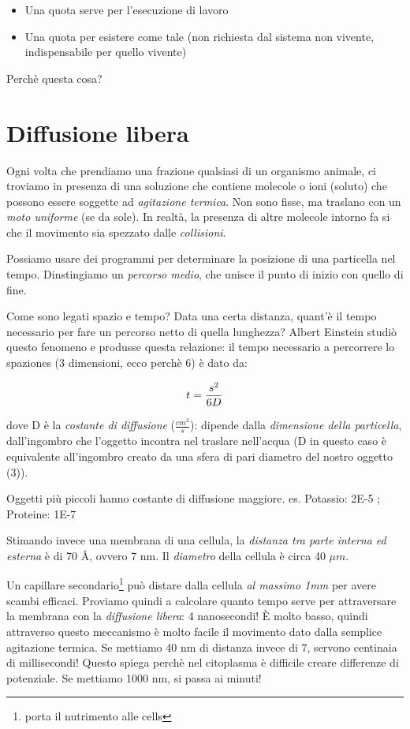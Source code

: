 \documentclass[a4paper,12pt]{article}
\begin{document}
\begin{itemize}
\item{Una quota serve per l'esecuzione di lavoro}
\item{Una quota per esistere come tale (non richiesta dal sistema non vivente, indispensabile per quello vivente)}
\end{itemize}

Perchè questa cosa?

\section{Diffusione libera}
Ogni volta che prendiamo una frazione qualsiasi di un organismo animale, ci troviamo in presenza di una soluzione che contiene molecole o ioni (soluto) che possono essere soggette ad \emph{agitazione termica}. Non sono fisse, ma traslano con un \emph{moto uniforme} (se da sole). In realtà, la presenza di altre molecole intorno fa si che il movimento sia spezzato dalle \emph{collisioni}.

Possiamo usare dei programmi per determinare la posizione di una particella nel tempo. 
Dinstingiamo un \emph{percorso medio}, che unisce il punto di inizio con quello di fine. 

Come sono legati spazio e tempo? Data una certa distanza, quant'è il tempo necessario per fare un percorso netto di quella lunghezza? 
Albert Einstein studiò questo fenomeno e produsse questa relazione: il tempo necessario a percorrere lo spaziones (3 dimensioni, ecco perchè 6) è dato da:

\begin{equation}
\centering
t=\frac{s^{2}}{6D}
\end{equation}

dove D è la \emph{costante di diffusione} ($\frac{cm^{2}}{s}$): dipende dalla \emph{dimensione della particella}, dall'ingombro che l'oggetto incontra nel traslare nell'acqua (D in questo caso è equivalente all'ingombro creato da una sfera di pari diametro del nostro oggetto (3)).

Oggetti più piccoli hanno costante di diffusione maggiore. 
es. Potassio: 2E-5 ; Proteine: 1E-7

Stimando invece una membrana di una cellula, la \emph{distanza tra parte interna ed esterna} è di 70 \AA, ovvero 7 nm.
Il \emph{diametro} della cellula è circa 40 $\mu m $.

Un capillare secondario\footnote{porta il nutrimento alle cells} può distare dalla cellula \emph{al massimo 1mm} per avere scambi efficaci. Proviamo quindi a calcolare quanto tempo serve per attraversare la membrana con la \emph{diffusione libera}: 4 nanosecondi! È molto basso, quindi attraverso questo meccanismo è molto facile il movimento dato dalla semplice agitazione termica. Se mettiamo 40 nm di distanza invece di 7, servono centinaia di millisecondi! Questo spiega perchè nel citoplasma è difficile creare differenze di potenziale. Se mettiamo 1000 nm, si passa ai minuti!
\end{document}
